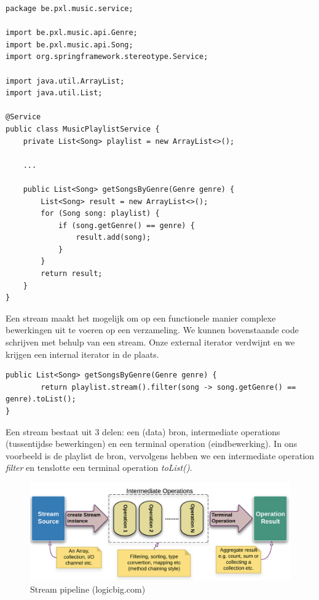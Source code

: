 \begin{lstlisting}
package be.pxl.music.service;

import be.pxl.music.api.Genre;
import be.pxl.music.api.Song;
import org.springframework.stereotype.Service;

import java.util.ArrayList;
import java.util.List;

@Service
public class MusicPlaylistService {
	private List<Song> playlist = new ArrayList<>();

	... 
	
	public List<Song> getSongsByGenre(Genre genre) {
		List<Song> result = new ArrayList<>();
		for (Song song: playlist) {
			if (song.getGenre() == genre) {
				result.add(song);
			}
		}
		return result;
	}
}

\end{lstlisting}

Een stream maakt het mogelijk om op een functionele manier complexe bewerkingen uit te voeren op een verzameling.
We kunnen bovenstaande code schrijven met behulp van een stream. Onze external iterator verdwijnt en we krijgen een internal iterator in de plaats.

\begin{lstlisting}
public List<Song> getSongsByGenre(Genre genre) {
		return playlist.stream().filter(song -> song.getGenre() == genre).toList();
}
\end{lstlisting}

Een stream bestaat uit 3 delen: een (data) bron, intermediate operations (tussentijdse bewerkingen) en een terminal operation (eindbewerking). In ons voorbeeld is de playlist de bron, vervolgens hebben we een intermediate operation \textit{filter} en tenslotte een terminal operation \textit{toList()}.

\begin{figure}[H]
  \includegraphics[width=\linewidth]{images/h6/stream_pipeline.png}
  \caption{Stream pipeline (logicbig.com)}
  \label{fig:stream_of}
\end{figure}


